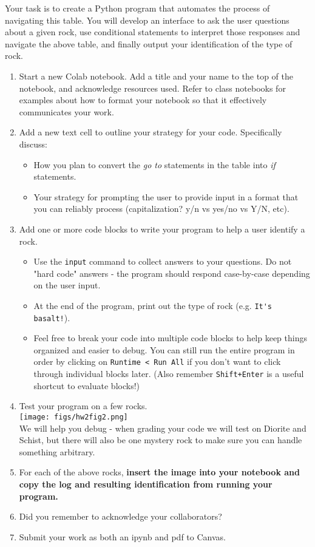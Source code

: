 \documentclass[12pt]{article}
\begin{document}
Your task is to create a Python program that automates the process of navigating this table. You will develop an interface to ask the user questions about a given rock, use conditional statements to interpret those responses and navigate the above table, and finally output your identification of the type of rock.

\begin{enumerate}
    \item Start a new Colab notebook. Add a title and your name to the top of the notebook, and acknowledge resources used. Refer to class notebooks for examples about how to format your notebook so that it effectively communicates your work.
    \item Add a new text cell to outline your strategy for your code. Specifically discuss:
    \begin{itemize}
        \item How you plan to convert the \textit{go to} statements in the table into \textit{if} statements.
        \item Your strategy for prompting the user to provide input in a format that you can reliably process (capitalization? y/n vs yes/no vs Y/N, etc).
    \end{itemize}
    \item Add one or more code blocks to write your program to help a user identify a rock.
    \begin{itemize}
        \item Use the \verb!input! command to collect answers to your questions. Do not "hard code" answers - the program should respond case-by-case depending on the user input.
        \item At the end of the program, print out the type of rock (e.g. \verb~It's basalt!~).
        \item Feel free to break your code into multiple code blocks to help keep things organized and easier to debug. You can still run the entire program in order by clicking on \verb~Runtime < Run All~ if you don't want to click through individual blocks later. (Also remember \verb~Shift+Enter~ is a useful shortcut to evaluate blocks!)
    \end{itemize}
    \item Test your program on a few rocks.\\
    \texttt{[image: figs/hw2fig2.png]}\\
    We will help you debug - when grading your code we will test on Diorite and Schist, but there will also be one mystery rock to make sure you can handle something arbitrary.
    \item For each of the above rocks, \textbf{insert the image into your notebook and copy the log and resulting identification from running your program. }
    \item Did you remember to acknowledge your collaborators?
    \item Submit your work as both an ipynb and pdf to Canvas.
\end{enumerate}
\end{document}
